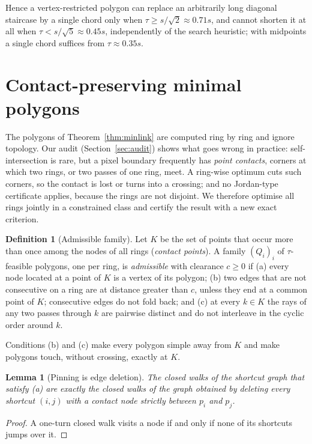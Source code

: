 \documentclass[11pt,a4paper]{article}
\newtheorem{lemma}[theorem]{Lemma}
\theoremstyle{definition}
\newtheorem{definition}[theorem]{Definition}
\theoremstyle{remark}
\begin{document}
Hence a vertex-restricted polygon can replace an arbitrarily long diagonal
staircase by a single chord only when $\tau\ge s/\sqrt2\approx0.71s$, and
cannot shorten it at all when $\tau<s/\sqrt5\approx0.45s$, independently of
the search heuristic; with midpoints a single chord suffices from
$\tau\approx0.35s$.

\section{Contact-preserving minimal polygons}\label{sec:constrained}

The polygons of Theorem~\ref{thm:minlink} are computed ring by ring and ignore
topology. Our audit (Section~\ref{sec:audit}) shows what goes wrong in
practice: self-intersection is rare, but a pixel boundary frequently has
\emph{point contacts}, corners at which two rings, or two passes of one ring,
meet. A ring-wise optimum cuts such corners, so the contact is lost or turns
into a crossing; and no Jordan-type certificate applies, because the rings are
not disjoint. We therefore optimise all rings jointly in a constrained class
and certify the result with a new exact criterion.

\begin{definition}[Admissible family]\label{def:admissible}
Let $K$ be the set of points that occur more than once among the nodes of all
rings (\emph{contact points}). A family $(Q_i)_i$ of $\tau$-feasible polygons,
one per ring, is \emph{admissible} with clearance $c\ge0$ if
(a) every node located at a point of $K$ is a vertex of its polygon;
(b) two edges that are not consecutive on a ring are at distance greater than
$c$, unless they end at a common point of $K$; consecutive edges do not fold
back; and
(c) at every $k\in K$ the rays of any two passes through $k$ are pairwise
distinct and do not interleave in the cyclic order around $k$.
\end{definition}

Conditions (b) and (c) make every polygon simple away from $K$ and make
polygons touch, without crossing, exactly at $K$.

\begin{lemma}[Pinning is edge deletion]\label{lem:pin}
The closed walks of the shortcut graph that satisfy (a) are exactly the closed
walks of the graph obtained by deleting every shortcut $(i,j)$ with a contact
node strictly between $p_i$ and $p_j$.
\end{lemma}
\begin{proof}
A one-turn closed walk visits a node if and only if none of its shortcuts
jumps over it.
\end{proof}
\end{document}
